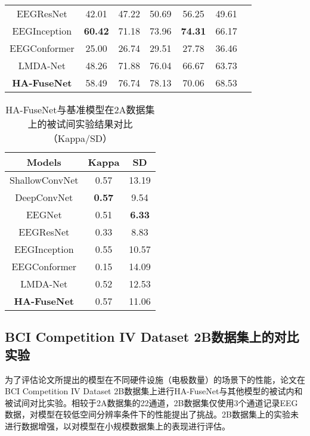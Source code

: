 \begin{table}[H]
\begin{subtable}[ht]{\textwidth}
\begin{tabularx}{\textwidth}{CCCCCCC}
        EEGResNet\cite{HBM:HBM23730}  & 42.01 & 47.22 & 50.69 & 56.25 & 49.61 \\
        EEGInception\cite{zhang2021eeg}  & \textbf{60.42} & 71.18 & 73.96 & \textbf{74.31} & 66.17 \\
        EEGConformer\cite{song2022eeg} & 25.00 & 26.74 & 29.51 & 27.78 & 36.46\\
        LMDA-Net\cite{miao2023lmda}  & 48.26 & 71.88 & 76.04 & 66.67 & 63.73\\
        \midrule 
        \textbf{HA-FuseNet}  & 58.49 & 76.74 & 78.13 & 70.06 & 68.53 \\
        \bottomrule
      \end{tabularx}
    \end{subtable}
\end{table}
\begin{table}[ht]
    \centering
    \caption{HA-FuseNet与基准模型在2A数据集上的被试间实验结果对比（Kappa/SD）}
    \label{tab:2acomparecrosssd}
    \begin{tabularx}{\textwidth}{CCC}
      \toprule
      Models & Kappa & SD \\
      \midrule
      ShallowConvNet\cite{schirrmeister2017deep} &0.57&13.19 \\
      DeepConvNet\cite{schirrmeister2017deep} &\textbf{0.57} &9.54\\
      EEGNet\cite{lawhern2018eegnet} &0.51& \textbf{6.33}\\
      EEGResNet\cite{HBM:HBM23730} &0.33&8.83\\
      EEGInception\cite{zhang2021eeg} &0.55&10.57\\
      EEGConformer\cite{song2022eeg}&0.15&14.09 \\
      LMDA-Net\cite{miao2023lmda} &0.52&12.53\\
      \midrule 
      \textbf{HA-FuseNet} &0.57&11.06\\
      \bottomrule
    \end{tabularx}
\end{table}

\subsection{BCI Competition IV Dataset 2B数据集上的对比实验}

为了评估论文所提出的模型在不同硬件设施（电极数量）的场景下的性能，论文在BCI Competition IV Dataset 2B数据集上进行HA-FuseNet与其他模型的被试内和被试间对比实验。相较于2A数据集的22通道，2B数据集仅使用3个通道记录EEG数据，对模型在较低空间分辨率条件下的性能提出了挑战。2B数据集上的实验未进行数据增强，以对模型在小规模数据集上的表现进行评估。

